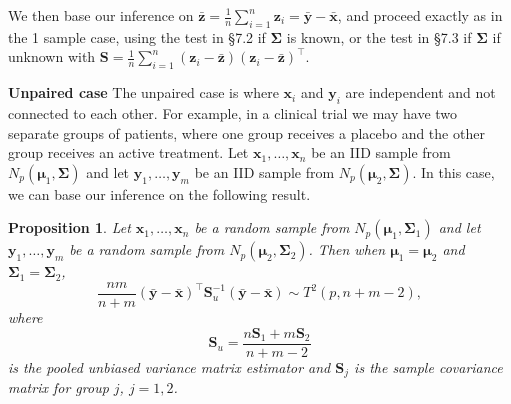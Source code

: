 \documentclass[]{book}
\newtheorem{proposition}{Proposition}[chapter]
\theoremstyle{definition}
\theoremstyle{definition}
\theoremstyle{definition}
\theoremstyle{remark}
\begin{document}
We then base our inference on \(\bar{\boldsymbol z} = \frac{1}{n} \sum_{i=1}^n \boldsymbol z_i = \bar{\boldsymbol y} - \bar{\boldsymbol x}\), and proceed exactly as in the 1 sample case, using the test in \S 7.2 if \(\boldsymbol \Sigma\) is known, or the test in \S 7.3 if \(\boldsymbol \Sigma\) if unknown with \(\boldsymbol S= \frac{1}{n} \sum_{i=1}^n (\boldsymbol z_i - \bar{\boldsymbol z})(\boldsymbol z_i - \bar{\boldsymbol z})^\top\).

\textbf{Unpaired case} The unpaired case is where \(\boldsymbol x_i\) and \(\boldsymbol y_i\) are independent and not connected to each other. For example, in a clinical trial we may have two separate groups of patients, where one group receives a placebo and the other group receives an active treatment. Let \(\boldsymbol x_1,\ldots,\boldsymbol x_n\) be an IID sample from \(N_p(\boldsymbol \mu_1,\boldsymbol \Sigma)\) and let \(\boldsymbol y_1,\ldots,\boldsymbol y_m\) be an IID sample from \(N_p(\boldsymbol \mu_2,\boldsymbol \Sigma)\). In this case, we can base our inference on the following result.

\begin{proposition}
\protect\hypertarget{prp:seven1}{}{\label{prp:seven1} }Let \(\boldsymbol x_1,\ldots,\boldsymbol x_n\) be a random sample from \(N_p(\boldsymbol \mu_1,\boldsymbol \Sigma_1)\) and let \(\boldsymbol y_1,\ldots,\boldsymbol y_m\) be a random sample from \(N_p(\boldsymbol \mu_2,\boldsymbol \Sigma_2)\). Then when \(\boldsymbol \mu_1 = \boldsymbol \mu_2\) and \(\boldsymbol \Sigma_1 = \boldsymbol \Sigma_2\),
\[\frac{nm}{n+m} (\bar{\boldsymbol y} - \bar{\boldsymbol x})^\top \boldsymbol S_u^{-1} (\bar{\boldsymbol y} - \bar{\boldsymbol x}) \sim T^2(p,n+m-2),\]
where
\[\boldsymbol S_u = \frac{n\boldsymbol S_1 + m\boldsymbol S_2}{n+m-2}\]
is the pooled unbiased variance matrix estimator
and \(\boldsymbol S_j\) is the sample covariance matrix for group \(j\), \(j=1,2\).
\end{proposition}
\end{document}
